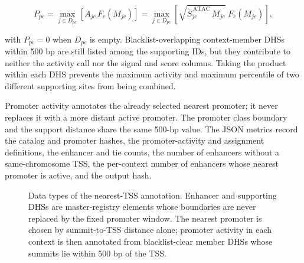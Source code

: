\documentclass[11pt]{article}
\begin{document}
\[
  P_{pc} = \max_{j\in D_{pc}}\left[A_{jc}\,F_{c}(M_{jc})\right]
  = \max_{j\in D_{pc}}\left[\sqrt{\overline{S}^{\,\mathrm{ATAC}}_{jc}\,M_{jc}}\;F_{c}(M_{jc})\right],
\]

with \(P_{pc}=0\) when \(D_{pc}\) is empty.  Blacklist-overlapping
context-member DHSs within 500 bp are still listed among the supporting IDs,
but they contribute to neither the activity call nor the signal and score
columns.  Taking the product within each DHS prevents the maximum activity and
maximum percentile of two different supporting sites from being combined.

Promoter activity annotates the already selected nearest promoter; it never
replaces it with a more distant active promoter.  The promoter class boundary
and the support distance share the same 500-bp value.  The JSON
metrics record the catalog and promoter hashes, the promoter-activity and
assignment definitions, the enhancer and tie counts, the number of enhancers
without a same-chromosome TSS, the per-context number of enhancers whose
nearest promoter is active, and the output hash.

\begin{figure}[htbp]
\centering
{}
\caption{Data types of the nearest-TSS annotation.  Enhancer and supporting DHSs
are master-registry elements whose boundaries are never replaced by the fixed
promoter window.  The nearest promoter is chosen by summit-to-TSS distance
alone; promoter activity in each context is then annotated from blacklist-clear
member DHSs whose summits lie within 500 bp of the TSS.}
\label{fig:nearest-tss}
\end{figure}
\end{document}

